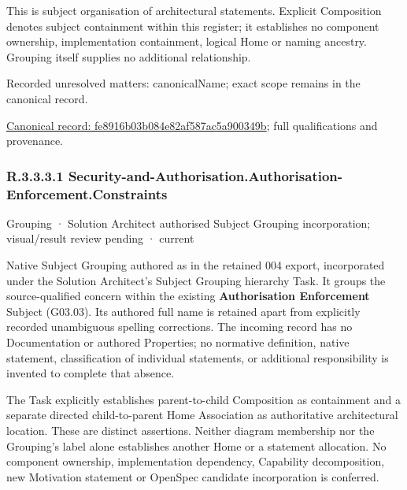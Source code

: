 This is subject organisation of architectural statements. Explicit Composition denotes subject containment within this register; it establishes no component ownership, implementation containment, logical Home or naming ancestry. Grouping itself supplies no additional relationship.


{\small Recorded unresolved matters: canonicalName; exact scope remains in the canonical record.}\par
{\footnotesize \href{../../../../continuum/grouping/fe8916b03b084e82af587ac5a900349b.md}{Canonical record: fe8916b03b084e82af587ac5a900349b}; full qualifications and provenance.}\par
\subsubsection*{R.3.3.3.1 Security-and-Authorisation.Authorisation-Enforcement.Constraints}
\label{navigation:R.3.3.3.1}

\label{element:202ebe880cc8456bb5e9f1389cc26fe8}
{\small Grouping · Solution Architect authorised Subject Grouping incorporation; visual/result review pending · current}\par

Native Subject Grouping authored as \texttt{} in the retained 004 export,
incorporated under the Solution Architect's Subject Grouping hierarchy Task.
It groups the source-qualified \texttt{} concern within
the existing \textbf{Authorisation Enforcement} Subject (G03.03). Its authored full name
is retained apart from explicitly recorded unambiguous spelling corrections.
The incoming record has no Documentation or authored Properties; no normative
definition, native statement, classification of individual statements, or
additional responsibility is invented to complete that absence.



The Task explicitly establishes parent-to-child Composition as containment and
a separate directed child-to-parent Home Association as authoritative architectural
location. These are distinct assertions. Neither diagram membership nor the
Grouping's label alone establishes another Home or a statement allocation.
No component ownership, implementation dependency, Capability decomposition,
new Motivation statement or OpenSpec candidate incorporation is conferred.



